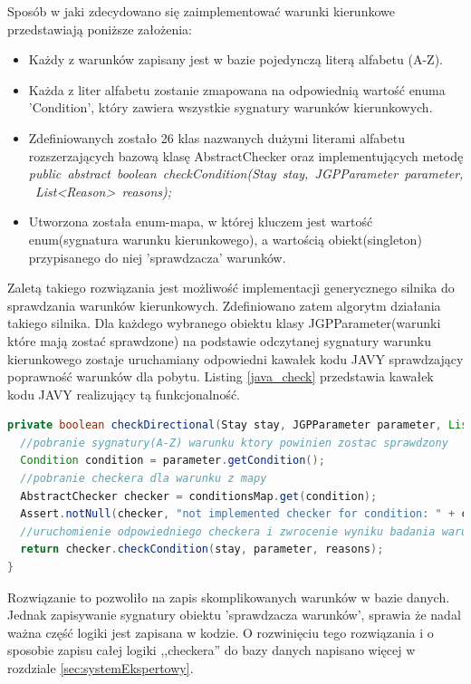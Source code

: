 Sposób w jaki zdecydowano się zaimplementować warunki kierunkowe przedstawiają poniższe założenia:
\begin{itemize}
\item Każdy z warunków zapisany jest w bazie pojedynczą literą alfabetu (A-Z).
\item Każda z liter alfabetu zostanie zmapowana na odpowiednią wartość enuma 'Condition', który zawiera wszystkie sygnatury warunków kierunkowych.
\item Zdefiniowanych zostało 26 klas nazwanych dużymi literami alfabetu rozszerzających bazową klasę AbstractChecker oraz implementujących metodę \mbox{\textit{public abstract boolean checkCondition(Stay stay, JGPParameter parameter, List<Reason> reasons);}}
\item Utworzona została enum-mapa, w której kluczem jest wartość enum(sygnatura warunku kierunkowego), a wartością obiekt(singleton) przypisanego do niej 'sprawdzacza' warunków.
\end{itemize}
Zaletą takiego rozwiązania jest możliwość implementacji generycznego silnika do sprawdzania warunków kierunkowych. Zdefiniowano zatem algorytm działania takiego silnika. Dla każdego wybranego obiektu klasy \mbox{JGPParameter}(warunki które mają zostać sprawdzone) na podstawie odczytanej sygnatury warunku kierunkowego zostaje uruchamiany odpowiedni kawałek kodu JAVY sprawdzający poprawność warunków dla pobytu. Listing \ref{java_check} przedstawia kawałek kodu JAVY realizujący tą funkcjonalność.

\begin{lstlisting}[language=Java,caption={Metoda sprawdzająca warunki kierunkowe. Autor: Mateusz Urbanik},label=java_check]
private boolean checkDirectional(Stay stay, JGPParameter parameter, List<Reason> reasons) {
  //pobranie sygnatury(A-Z) warunku ktory powinien zostac sprawdzony
  Condition condition = parameter.getCondition();
  //pobranie checkera dla warunku z mapy
  AbstractChecker checker = conditionsMap.get(condition);
  Assert.notNull(checker, "not implemented checker for condition: " + condition);
  //uruchomienie odpowiedniego checkera i zwrocenie wyniku badania warunku
  return checker.checkCondition(stay, parameter, reasons);
}
\end{lstlisting}

Rozwiązanie to pozwoliło na zapis skomplikowanych warunków w bazie danych. Jednak zapisywanie sygnatury obiektu 'sprawdzacza warunków', sprawia że nadal ważna część logiki jest zapisana w kodzie. O rozwinięciu tego rozwiązania  i o sposobie zapisu całej logiki ,,checkera'' do bazy danych napisano więcej w rozdziale \ref{sec:systemEkspertowy}.

